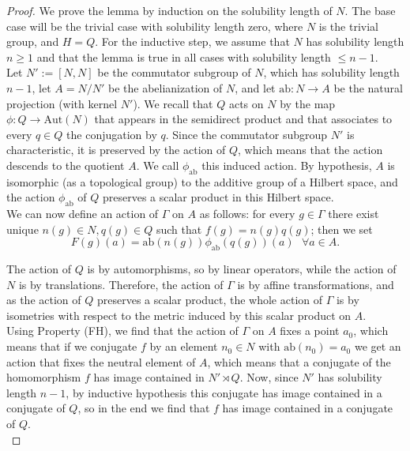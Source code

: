 \documentclass[10pt,a4paper]{amsart}
\begin{document}
\begin{proof}
    We prove the lemma by induction on the solubility length of $N$. The base case will be the trivial case with solubility length zero, where $N$ is the trivial group, and $H=Q$. For the inductive step, we assume that $N$ has solubility length $n\geq 1$ and that the lemma is true in all cases with solubility length $\leq n-1$. \\

    Let $N':=[N,N]$ be the commutator subgroup of $N$, which has solubility length $n-1$, let $A=N/N'$ be the abelianization of $N$, and let $\mathrm{ab}: N\rightarrow A$ be the natural projection (with kernel $N'$). We recall that $Q$ acts on $N$ by the map $\phi: Q\rightarrow\mathrm{Aut}(N)$ that appears in the semidirect product and that associates to every $q\in Q$ the conjugation by $q$. Since the commutator subgroup $N'$ is characteristic, it is preserved by the action of $Q$, which means that the action descends to the quotient $A$. We call $\phi_{\mathrm{ab}}$ this induced action. By hypothesis, $A$ is isomorphic (as a topological group) to the additive group of a Hilbert space, and the action $\phi_{\mathrm{ab}}$ of $Q$ preserves a scalar product in this Hilbert space. \\

    We can now define an action of $\Gamma$ on $A$ as follows: for every $g\in \Gamma$ there exist unique $n(g)\in N, q(g)\in Q$ such that $f(g)=n(g)q(g)$; then we set $$F(g)(a)=\mathrm{ab}(n(g))\phi_{\mathrm{ab}}(q(g))(a)\ \ \ \forall a\in A.$$
    
    The action of $Q$ is by automorphisms, so by linear operators, while the action of $N$ is by translations. Therefore, the action of $\Gamma$ is by affine transformations, and as the action of $Q$ preserves a scalar product, the whole action of $\Gamma$ is by isometries with respect to the metric induced by this scalar product on $A$. \\
    
    Using Property (FH), we find that the action of $\Gamma$ on $A$ fixes a point $a_0$, which means that if we conjugate $f$ by an element $n_0\in N$ with $\mathrm{ab}(n_0)=a_0$ we get an action that fixes the neutral element of $A$, which means that a conjugate of the homomorphism $f$ has image contained in $N'\rtimes Q$. Now, since $N'$ has solubility length $n-1$, by inductive hypothesis this conjugate has image contained in a conjugate of $Q$, so in the end we find that $f$ has image contained in a conjugate of $Q$. \\
    
\end{proof}
\end{document}
